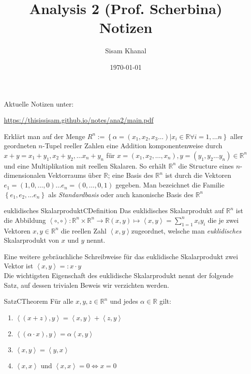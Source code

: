 \documentclass[11.5 pt, a4paper]{memoir}
\title{Analysis 2 (Prof. Scherbina) Notizen}
\author{Sisam Khanal}
\date{\today}
\begin{document}
\color{Black}
\maketitle
\vfill
{\centering \large Aktuelle Notizen unter: \\}
\vspace{0.3cm} 
\centerline{\href{https://thisissisam.github.io/notes/ana2/main.pdf}{https://thisissisam.github.io/notes/ana2/main.pdf}}
\thispagestyle{empty}
\newpage
\tableofcontents
{}

Erklärt man auf der Menge $ R^{n} := \left\{ \alpha = \left( x_1,x_2,x_3 \dots  \right) | x_{i} \in \mathbb{R} \forall i = 1, \dots n \right\}  $ 
aller geordneten $ n $-Tupel reeller Zahlen eine Addition komponentenweise 
durch  $ x+y = x_1+y_1, x_2+y_2, \dots x_{n} + y_{n}$  für 
$ x = \left( x_1,x_2, \dots, x_{n} \right), y = \left( y_1,y_2\dots y_{n} \right)
\in \mathbb{R}^{n} $ und eine Multiplikation mit reellen Skalaren. So erhält
$ \mathbb{R}^{n} $ die Structure eines $ n $-dimensionalen Vektorraums über
$ \mathbb{R} $; eine Basis des $ \mathbb{R}^{n} $ ist durch die Vektoren
$ e_1 = \left( 1, 0, \dots , 0 \right) \dots e_{n} = \left( 0, \dots, 0, 1\right)
$ gegeben. Man bezeichnet die Familie $ \left\{ e_1, e_2, \dots e_{n} \right\} $
als \textit{Standardbasis} oder auch kanonische Basis des $ \mathbb{R}^{n} $ 
   
\begin{ibox}{euklidisches Skalarprodukt}{CDefinition}
    Das euklidisches Skalarprodukt auf $ \mathbb{R}^{n} $ ist die Abbildung
    $ \left< \circ , \circ \right> : \mathbb{R}^{n} \times \mathbb{R}^{n}
    \to \mathbb{R} \left( x, y \right) \mapsto \left<x, y \right> = 
    \sum_{1=1}^n x_{i}y_{i}$ die je zwei Vektoren $ x, y \in \mathbb{R}^{n} $
    die reellen Zahl $ \left<x,y \right> $zugeordnet, welsche man 
    \textit{euklidisches} Skalarprodukt  von $ x \text{ und } y $ nennt. 
\end{ibox}

Eine weitere gebräuchliche Schreibweise für das euklidische Skalarprodukt zwei
Vektor ist $ \left<x,y \right> =: x \cdot y $ \\
Die wichtigsten Eigenschaft des euklidische Skalarprodukt nennt der folgende
Satz, auf dessen trivialen Beweis wir verzichten werden.

\begin{ibox}{Satz}{CTheorem}
    Für alle $ x, y, z \in \mathbb{R}^{n} $ und jedes $ \alpha \in  \mathbb{R} $ gilt:
    \begin{enumerate}[label=\alph*)]
        \item $ \left< \left( x + z \right) , y \right> = \left< x,y \right>
            + \left<z, y \right>$ 
        \item $ \left< \left( \alpha \cdot x \right), y \right> = \alpha
            \left< x, y \right>$ 
        \item $ \left< x, y \right> = \left< y,x \right> $ 
        \item $ \left<x,x \right>  $ und $ \left<x,x \right> = 0 \iff x = 0 $
    \end{enumerate}
\end{ibox}
\end{document}
